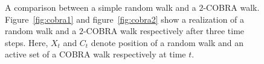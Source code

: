 \begin{figure}
\begin{minipage}{0.5\textwidth}
    \label{fig:cobra2}
    \end{minipage}

    
    \caption{A comparison between a simple random walk and a $2$-COBRA walk. Figure~\ref{fig:cobra1} and figure~\ref{fig:cobra2} show a realization of a random walk and a $2$-COBRA walk respectively after three time steps. Here, $X_t$ and $C_t$ denote position of a random walk and an active set of a COBRA walk respectively at time $t$. }
    \label{fig:cobra}
\end{figure}
